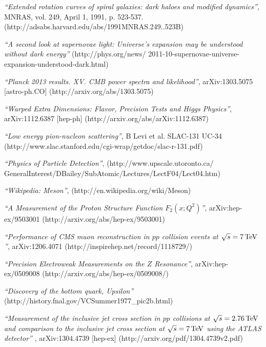 \begin{thebibliography}{999}
   \textit{``Extended rotation curves of spiral galaxies: dark haloes and modified dynamics''}, MNRAS, vol. 249, April 1, 1991, p. 523-537. (http://adsabs.harvard.edu/abs/1991MNRAS.249..523B)

   \textit{``A second look at supernovae light: Universe's expansion may be understood without dark energy''} (http://phys.org/news/ 2011-10-supernovae-universe-expansion-understood-dark.html)

   \textit{``Planck 2013 results. XV. CMB power spectra and likelihood''}, arXiv:1303.5075 [astro-ph.CO] (http://arxiv.org/abs/1303.5075)

   \textit{``Warped Extra Dimensions: Flavor, Precision Tests and Higgs Physics''}, 	arXiv:1112.6387 [hep-ph] (http://arxiv.org/abs/arXiv:1112.6387)
  
   \textit{``Low energy pion-nucleon scattering''}, B Levi et al. SLAC-131 UC-34 (http://www.slac.stanford.edu/cgi-wrap/getdoc/slac-r-131.pdf)
  
   \textit{``Physics of Particle Detection''}, (http://www.upscale.utoronto.ca/ GeneralInterest/DBailey/SubAtomic/Lectures/LectF04/Lect04.htm)

   \textit{``Wikipedia: Meson''}, (http://en.wikipedia.org/wiki/Meson)
  
   \textit{``A Measurement of the Proton Structure Function $F_2(x; Q^2)$''}, arXiv:hep-ex/9503001 (http://arxiv.org/abs/hep-ex/9503001)
  
   \textit{``Performance of CMS muon reconstruction in $pp$ collision events at $\sqrt{s} = 7 \mathrm{\,TeV}$''}, arXiv:1206.4071 (http://inspirehep.net/record/1118729/)
  
   \textit{``Precision Electroweak Measurements on the $Z$ Resonance''}, arXiv:hep-ex/0509008  (http://arxiv.org/abs/hep-ex/0509008/)
  
   \textit{``Discovery of the bottom quark, Upsilon''} (http://history.fnal.gov/VCSummer1977\_pic2b.html)
  
   \textit{``Measurement of the inclusive jet cross section in $pp$ collisions at $\sqrt{s}=2.76 \mathrm{\,TeV}$ and comparison to the inclusive jet cross section at $\sqrt{s}=7 \mathrm{\,TeV}$ using the ATLAS detector''} , 	arXiv:1304.4739 [hep-ex] (http://arxiv.org/pdf/1304.4739v2.pdf)
  
\end{thebibliography}
